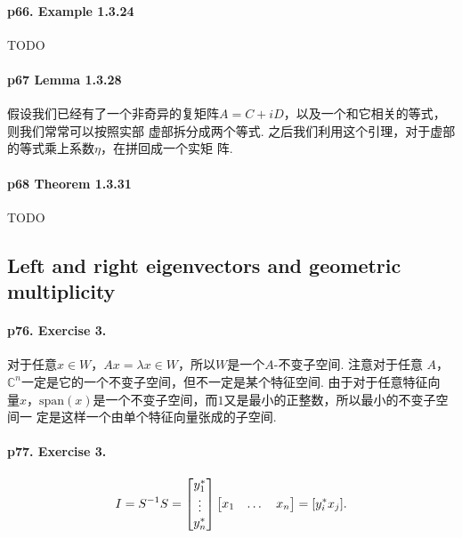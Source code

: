   \paragraph{p66. Example 1.3.24}
    TODO

  \paragraph{p67 Lemma 1.3.28}
    假设我们已经有了一个非奇异的复矩阵$A=C+iD$，以及一个和它相关的等式，则我们常常可以按照实部
    虚部拆分成两个等式. 之后我们利用这个引理，对于虚部的等式乘上系数$\eta$，在拼回成一个实矩
    阵. 

  \paragraph{p68 Theorem 1.3.31} TODO

\subsection{Left and right eigenvectors and geometric multiplicity}
  \paragraph{p76. Exercise 3.}
    对于任意$x\in W$，$Ax = \lambda x \in W$，所以$W$是一个$A$-不变子空间. 注意对于任意
    $A$，$\mathbb{C}^n$一定是它的一个不变子空间，但不一定是某个特征空间. 由于对于任意特征向
    量$x$，$\text{span}(x)$是一个不变子空间，而$1$又是最小的正整数，所以最小的不变子空间一
    定是这样一个由单个特征向量张成的子空间. 

  \paragraph{p77. Exercise 3.}
    \[
      I = S^{-1} S =
      \begin{bmatrix}
        y_1^* \\ \vdots \\ y_n^*
      \end{bmatrix}
      \begin{bmatrix}
        x_1 & \dots & x_n
      \end{bmatrix}
      = [y_i^*x_j].
    \]

